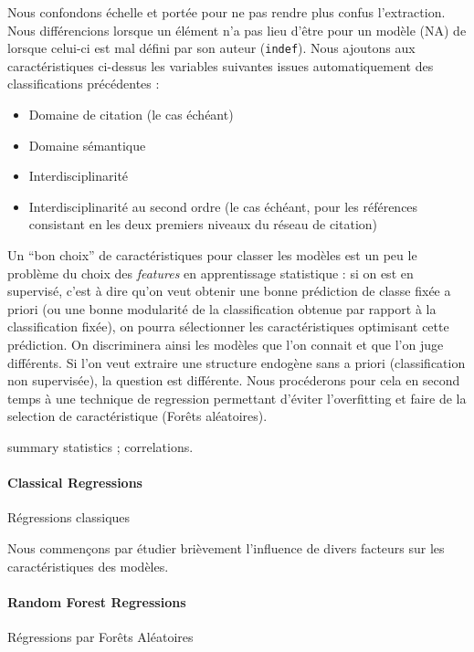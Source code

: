 Nous confondons échelle et portée pour ne pas rendre plus confus l'extraction. Nous différencions lorsque un élément n'a pas lieu d'être pour un modèle (NA) de lorsque celui-ci est mal défini par son auteur (\texttt{indef}). Nous ajoutons aux caractéristiques ci-dessus les variables suivantes issues automatiquement des classifications précédentes :

\begin{itemize}
\item Domaine de citation (le cas échéant)
\item Domaine sémantique
\item Interdisciplinarité
\item Interdisciplinarité au second ordre (le cas échéant, pour les références consistant en les deux premiers niveaux du réseau de citation)
\end{itemize}



Un ``bon choix'' de caractéristiques pour classer les modèles est un peu le problème du choix des \emph{features} en apprentissage statistique : si on est en supervisé, c'est à dire qu'on veut obtenir une bonne prédiction de classe fixée a priori (ou une bonne modularité de la classification obtenue par rapport à la classification fixée), on pourra sélectionner les caractéristiques optimisant cette prédiction. On discriminera ainsi les modèles que l'on connait et que l'on juge différents. Si l'on veut extraire une structure endogène sans a priori (classification non supervisée), la question est différente. Nous procéderons pour cela en second temps à une technique de regression permettant d'éviter l'overfitting et faire de la selection de caractéristique (Forêts aléatoires).


summary statistics ; correlations.


\paragraph{Classical Regressions}{Régressions classiques}

Nous commençons par étudier brièvement l'influence de divers facteurs sur les caractéristiques des modèles.



\paragraph{Random Forest Regressions}{Régressions par Forêts Aléatoires}




